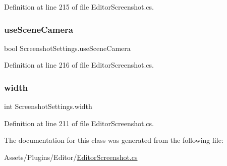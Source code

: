 Definition at line 215 of file Editor\+Screenshot.\+cs.

\mbox{\label{class_screenshot_settings_a16dd12e8ed63fba96ceb605ae3a8d4d7}} 
\subsubsection{\texorpdfstring{use\+Scene\+Camera}{useSceneCamera}}
{\footnotesize\ttfamily bool Screenshot\+Settings.\+use\+Scene\+Camera}



Definition at line 216 of file Editor\+Screenshot.\+cs.

\mbox{\label{class_screenshot_settings_af9b0c8022fb86b1903b697947c26180e}} 
\subsubsection{\texorpdfstring{width}{width}}
{\footnotesize\ttfamily int Screenshot\+Settings.\+width}



Definition at line 211 of file Editor\+Screenshot.\+cs.



The documentation for this class was generated from the following file\+:\begin{DoxyCompactItemize}
\item 
Assets/\+Plugins/\+Editor/\mbox{\hyperlink{_editor_screenshot_8cs}{Editor\+Screenshot.\+cs}}\end{DoxyCompactItemize}
